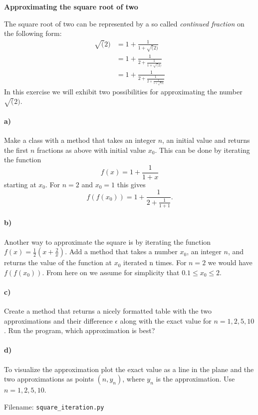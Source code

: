 \newpage
\begin{Problem}{\textbf{Approximating the square root of two}} \label{prob72}

\noindent The square root of two can be represented by a so called \emph{continued fraction}
on the following form:
\begin{align*}
\sqrt(2)&= 1 + \frac{1}{1+\sqrt(2)} \\
        &= 1 + \frac{1}{2+\frac{1}{1+\sqrt(2)}} \\
        &= 1 + \frac{1}{2+\frac{1}{2+\frac{1}{1+\sqrt(2)}}}
\end{align*}
In this exercise we will exhibit two possibilities for approximating the number
$\sqrt(2)$.

\paragraph{a)}
Make a class  with a method  that takes an integer $n$,
an initial value and returns the first $n$ fractions as above with initial value $x_0$. This can be done by iterating the
function
\begin{equation*}
    f(x) = 1+\frac{1}{1+x}
\end{equation*}
starting at $x_0$. For $n=2$ and $x_0=1$ this gives
\begin{equation*}
f(f(x_0)) = 1 + \frac{1}{2+\frac{1}{1+1}}.
\end{equation*}

\paragraph{b)}
Another way to approximate the square is by iterating the function $f(x)=\frac{1}{2}\left(x+\frac{2}{x}\right)$.
Add a method  that takes
a number $x_0$, an integer $n$, and
returns the value of the function at $x_0$ iterated n times. For $n=2$ we would have
$f(f(x_0))$. From here on we assume for simplicity that $0.1 \leq x_0 \leq 2$.

\paragraph{c)}
Create a method that returns a nicely formatted table with
the two approximations and their difference $\epsilon$ along with the exact value for $n=1,2,5,10$.
Run the program, which approximation is best?

\paragraph{d)}
To visualize the approximation plot the exact value as a line in the plane
and the two approximations as points $(n, y_n)$, where $y_n$ is the approximation. Use $n = 1,2,5,10$.

Filename: \texttt{square\_iteration.py}
\end{Problem}

